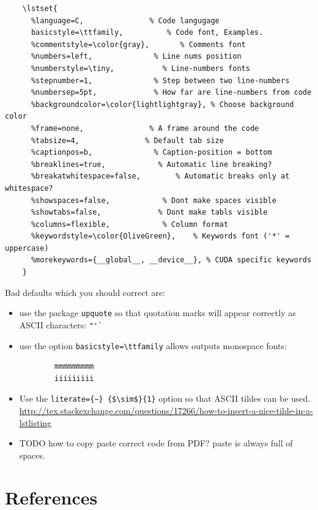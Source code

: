 \documentclass[12pt]{article}
\begin{document}
  \begin{lstlisting}
    \lstset{
      %language=C,               % Code langugage
      basicstyle=\ttfamily,          % Code font, Examples.
      %commentstyle=\color{gray},       % Comments font
      %numbers=left,              % Line nums position
      %numberstyle=\tiny,           % Line-numbers fonts
      %stepnumber=1,              % Step between two line-numbers
      %numbersep=5pt,             % How far are line-numbers from code
      %backgroundcolor=\color{lightlightgray}, % Choose background color
      %frame=none,               % A frame around the code
      %tabsize=4,               % Default tab size
      %captionpos=b,              % Caption-position = bottom
      %breaklines=true,            % Automatic line breaking?
      %breakatwhitespace=false,        % Automatic breaks only at whitespace?
      %showspaces=false,            % Dont make spaces visible
      %showtabs=false,             % Dont make tabls visible
      %columns=flexible,            % Column format
      %keywordstyle=\color{OliveGreen},    % Keywords font ('*' = uppercase)
      %morekeywords={__global__, __device__}, % CUDA specific keywords
    }
  \end{lstlisting}

  Bad defaults which you should correct are:

  \begin{itemize}
    \item use the package \lstinline|upquote| so that quotation marks will appear
      correctly as ASCII characters: \lstinline|"'`|
    \item use the option \lstinline|basicstyle=\ttfamily| allows outputs monospace fonts:
      \begin{lstlisting}
        mmmmmmmmm
        iiiiiiiii
      \end{lstlisting}
    \item Use the \lstinline|literate={~} {$\sim$}{1}| option so that ASCII tildes can be used.
      \url{http://tex.stackexchange.com/questions/17266/how-to-insert-a-nice-tilde-in-a-lstlisting}
    \item TODO how to copy paste correct code from PDF? paste is always full of spaces.
  \end{itemize}

\section{References}\label{references}
\end{document}
